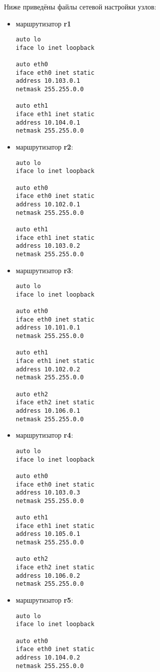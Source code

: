 \documentclass[a4paper,12pt]{article}
\begin{document}
Ниже приведёны файлы сетевой настройки узлов:
\begin{itemize}

\item маршрутизатор \textbf{r1}
\begin{Verbatim}
auto lo
iface lo inet loopback

auto eth0
iface eth0 inet static
address 10.103.0.1
netmask 255.255.0.0

auto eth1
iface eth1 inet static
address 10.104.0.1
netmask 255.255.0.0
\end{Verbatim}

\item маршрутизатор \textbf{r2}:
\begin{Verbatim}
auto lo
iface lo inet loopback

auto eth0
iface eth0 inet static
address 10.102.0.1
netmask 255.255.0.0

auto eth1
iface eth1 inet static
address 10.103.0.2
netmask 255.255.0.0
\end{Verbatim}

\item маршрутизатор \textbf{r3}:
\begin{Verbatim}
auto lo
iface lo inet loopback

auto eth0
iface eth0 inet static
address 10.101.0.1
netmask 255.255.0.0

auto eth1
iface eth1 inet static
address 10.102.0.2
netmask 255.255.0.0

auto eth2
iface eth2 inet static
address 10.106.0.1
netmask 255.255.0.0
\end{Verbatim}

\item маршрутизатор \textbf{r4}:
\begin{Verbatim}
auto lo
iface lo inet loopback

auto eth0
iface eth0 inet static
address 10.103.0.3
netmask 255.255.0.0

auto eth1
iface eth1 inet static
address 10.105.0.1
netmask 255.255.0.0

auto eth2
iface eth2 inet static
address 10.106.0.2
netmask 255.255.0.0
\end{Verbatim}

\item маршрутизатор \textbf{r5}:
\begin{Verbatim}
auto lo
iface lo inet loopback

auto eth0
iface eth0 inet static
address 10.104.0.2
netmask 255.255.0.0


\end{Verbatim}
\end{itemize}
\end{document}
